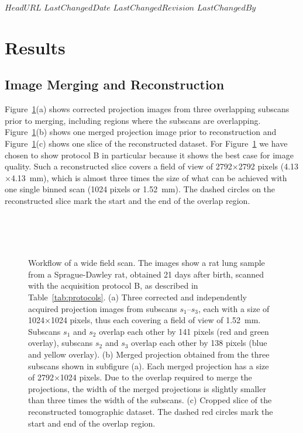 \svnidlong
{$HeadURL$}
{$LastChangedDate$}
{$LastChangedRevision$}
{$LastChangedBy$}

\section{Results}\label{sec:Results}
\subsection{Image Merging and Reconstruction}\label{sec:Image Merging and Reconstruction}
Figure~\ref{fig:wide-field-scan-results}(a) shows corrected projection images from three overlapping subscans prior to merging, including regions where the subscans are overlapping. Figure~\ref{fig:wide-field-scan-results}(b) shows one merged projection image prior to reconstruction and Figure~\ref{fig:wide-field-scan-results}(c) shows one slice of the reconstructed dataset. For Figure~\ref{fig:wide-field-scan-results} we have chosen to show protocol B in particular because it shows the best case for image quality. Such a reconstructed slice covers a field of view of 2792$\times$2792 pixels (4.13$\times$\SI{4.13}{\milli\meter}), which is almost three times the size of what can be achieved with one single binned scan (1024 pixels or \SI{1.52}{\milli\meter}). %
The dashed circles on the reconstructed slice mark the start and the end of the overlap region.

\begin{figure}
	\centering
	\caption{Workflow of a wide field scan. The images show a rat lung sample from a Sprague-Dawley rat, obtained 21 days after birth, scanned with the acquisition protocol B, as described in Table~\ref{tab:protocols}. %
			(a) Three corrected and independently acquired projection images from subscans $s_1$--$s_3$, each with a size of 1024\(\times\)1024 pixels, thus each covering a field of view of \SI{1.52}{\milli\meter}. Subscans $s_1$ and $s_2$ overlap each other by 141 pixels (red and green overlay), subscans $s_2$ and $s_3$ overlap each other by 138 pixels (blue and yellow overlay). %
			(b) Merged projection obtained from the three subscans shown in subfigure (a). Each merged projection has a size of 2792\(\times\)1024 pixels. Due to the overlap required to merge the projections, the width of the merged projections is slightly smaller than three times the width of the subscans. %
			(c) Cropped slice of the reconstructed tomographic dataset. The dashed red circles mark the start and end of the overlap region.}
	\ifiucr
		\\%
		\\%
		\\%
	\else
	\fi
	\label{fig:wide-field-scan-results}
\end{figure}

